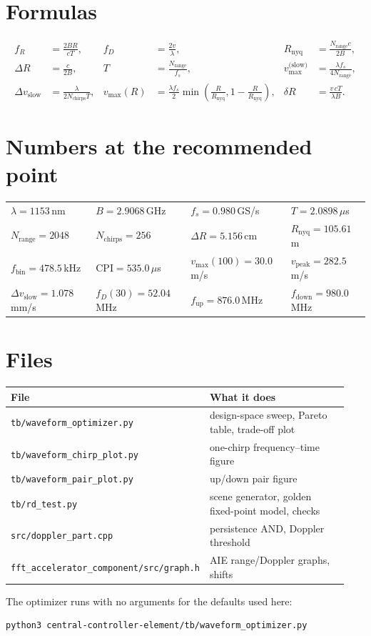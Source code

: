 \documentclass[11pt,a4paper]{article}
\newcommand{\fs}{f_s}
\newcommand{\Rnyq}{R_{\mathrm{nyq}}}
\newcommand{\vmax}{v_{\max}}
\newcommand{\dR}{\Delta R}
\newcommand{\CPI}{\mathrm{CPI}}
\begin{document}
\appendix
\section{Formulas}

\begin{align}
f_R &= \frac{2BR}{cT}, &
f_D &= \frac{2v}{\lambda}, &
\Rnyq &= \frac{N_{\text{range}}c}{2B}, \\
\dR &= \frac{c}{2B}, &
T &= \frac{N_{\text{range}}}{\fs}, &
\vmax^{\text{(slow)}} &= \frac{\lambda\fs}{4N_{\text{range}}}, \\
\Delta v_{\text{slow}} &= \frac{\lambda}{2N_{\text{chirps}}T}, &
\vmax(R) &= \frac{\lambda\fs}{2}\min\!\left(\frac{R}{\Rnyq},1-\frac{R}{\Rnyq}\right), &
\delta R &= \frac{v\,cT}{\lambda B}.
\end{align}

\section{Numbers at the recommended point}
\begin{center}
\small
\begin{tabular}{@{}llll@{}}
\toprule
$\lambda = 1153$\,nm & $B = 2.9068$\,GHz & $\fs = 0.980$\,GS/s &
$T = 2.0898\,\mu$s \\
$N_{\text{range}} = 2048$ & $N_{\text{chirps}} = 256$ &
$\dR = 5.156$\,cm & $\Rnyq = 105.61$\,m \\
$f_{\text{bin}} = 478.5$\,kHz & $\CPI = 535.0\,\mu$s &
$\vmax(100) = 30.0$\,m/s & $v_{\text{peak}} = 282.5$\,m/s \\
$\Delta v_{\text{slow}} = 1.078$\,mm/s & $f_D(30) = 52.04$\,MHz &
$f_{\text{up}} = 876.0$\,MHz & $f_{\text{down}} = 980.0$\,MHz \\
\bottomrule
\end{tabular}
\end{center}

\section{Files}
\begin{center}
\small
\begin{tabular}{@{}p{0.47\linewidth}p{0.47\linewidth}@{}}
\toprule
File & What it does \\
\midrule
\texttt{tb/waveform\_optimizer.py} & design-space sweep, Pareto table, trade-off plot \\
\texttt{tb/waveform\_chirp\_plot.py} & one-chirp frequency--time figure \\
\texttt{tb/waveform\_pair\_plot.py} & up/down pair figure \\
\texttt{tb/rd\_test.py} & scene generator, golden fixed-point model, checks \\
\texttt{src/doppler\_part.cpp} & persistence AND, Doppler threshold \\
\texttt{fft\_accelerator\_component/src/graph.h} & AIE range/Doppler graphs, shifts \\
\bottomrule
\end{tabular}
\end{center}

\vspace{4pt}
\noindent\small The optimizer runs with no arguments for the defaults used
here:
\begin{verbatim}
python3 central-controller-element/tb/waveform_optimizer.py
\end{verbatim}
\end{document}
